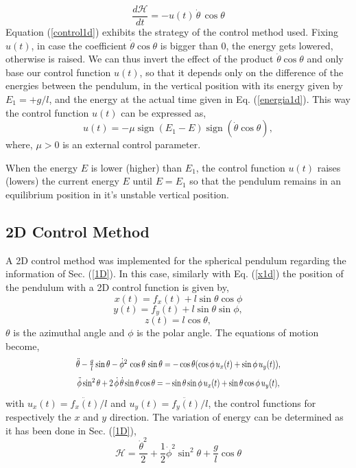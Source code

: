 \documentclass[prd,twocolumn,nofootinbib,showpacs]{revtex4-1}
\DeclareMathOperator{\sign}{sign}
\begin{document}
\begin{equation}
    \frac{d\mathcal{H}}{dt}=-u(t) \,\dot{\theta}\,\cos{\theta}
    \label{control1d}
\end{equation}
Equation (\ref{control1d}) exhibits  the strategy of the control  method used. Fixing $u(t)$, in case the coefficient $\dot{\theta}\cos{\theta}$ is bigger than 0, the energy gets lowered, otherwise is raised. We can thus invert the effect of the product $\dot{\theta}\cos{\theta}$ and only base our control function $u(t)$, so that it depends only on the  difference of the energies between the pendulum, in the vertical position with its energy given by $E_1=+g/l$, and the energy at the actual time given in Eq. (\ref{energia1d}). This way the control function $u(t)$ can be expressed as,
\begin{equation}
    u(t)=-\mu  \sign\left({E_1-E}\right) \sign{(\dot{\theta} \cos{\theta})},
    \label{u1d}
\end{equation}
where, $\mu>0$ is an external control parameter.
\par When the energy $E$ is lower (higher) than $E_1$, the control function $u(t)$ raises (lowers) the current energy $E$ until $E=E_1$ so that the pendulum remains in an equilibrium position in it's unstable vertical position. 

\subsection{2D Control Method}
A 2D control method was implemented for the spherical pendulum regarding the information of Sec. (\ref{1D}). In this case, similarly with Eq. (\ref{x1d}) the position of the pendulum with a 2D control function is given by,
\begin{equation}
x(t) =f_x(t)+ l \sin{\theta}\cos{\phi}   
\end{equation}
\begin{equation}
  y(t)=f_y(t)+l\sin{\theta}\sin{\phi} ,
\end{equation}
\begin{equation}
    z(t)=l \cos{\theta},
\end{equation}
 $\theta$ is the azimuthal angle and $\phi$ is the polar angle. The equations of motion become,
\begin{equation}
\scalebox{0.80}[1]{$\ddot{\theta}-\frac{g}{l}\sin{\theta}- \dot{\phi}^2\, \cos{\theta}\,\sin\theta =-\cos{\theta} (\cos{\phi}\, u_x(t)+ \sin{\phi}\, u_y(t)),$}
\label{teta2d}
\end{equation}
\begin{equation}
  \scalebox{0.78}[1]{$\ddot{\phi}\sin^2{\theta} +2 \, \dot{\phi} \,\dot{\theta}\sin{\theta} \cos{\theta}= -\sin{\theta}\sin{\phi}\, u_x(t) + \sin{\theta}\cos{\phi} \,u_y(t),$}
  \label{phi2d}
\end{equation}
with $u_x(t)=\ddot{f_x(t)}/l$ and $u_y(t)=\ddot{f_y(t)}/l$, the control functions for respectively the $x$ and $y$ direction. The variation of energy can be determined as it has been done in Sec. (\ref{1D}),
\begin{equation}
    \mathcal{H}=\frac{\dot{\theta}^2}{2}+\frac{1}{2}\dot{\phi}^2 \sin^2{\theta}+\frac{g}{l}\cos{\theta}
\end{equation}
\end{document}
